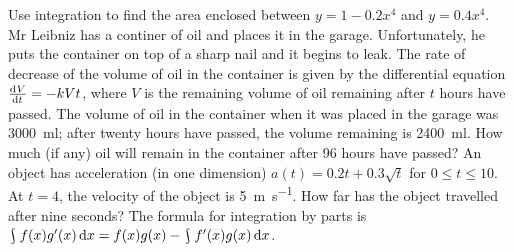 \begin{questions}
  \questioM Use integration to find the area enclosed between $ y = 1-0.2x^4 $ and $ y = 0.4x^4 $.
  \questioE Mr Leibniz has a continer of oil and places it in the garage. Unfortunately, he puts the container on
            top of a sharp nail and it begins to leak. The rate of decrease of the volume of oil in the container is
            given by the differential equation $ \od{V}{t} = -kVt $, where $ V $ is the remaining volume of oil remaining
            after $ t $ hours have passed. The volume of oil in the container when it was placed in the garage
            was \SI{3000}{\milli\litre}; after twenty hours have passed, the volume remaining is \SI{2400}{\milli\litre}.
            How much (if any) oil will remain in the container after 96 hours have passed?
  \questioM An object has acceleration (in one dimension) $ a(t) = 0.2t + 0.3\sqrt{t} $ for $ 0 \leq t \leq 10 $. At $ t = 4 $,
            the velocity of the object is \SI{5}{\metre\per\second}. How far has the object travelled after nine seconds?
  \questioS The formula for integration by parts is $ \rint f(x) g'(x) \dif{x} = f(x) g(x) - \rint f'(x) g(x) \dif{x} $.
  \question
    \begin{parts}

\end{parts}
\end{questions}
